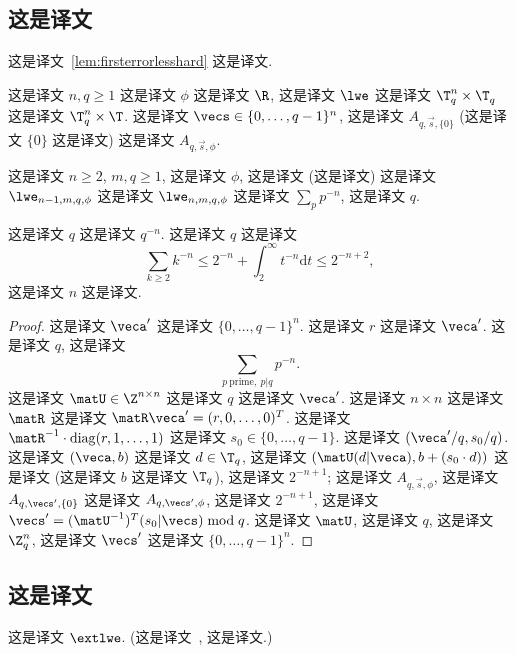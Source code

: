
\subsection{这是译文}
\label{sec:firstiserrorless}

这是译文~\ref{lem:firsterrorlesshard} 这是译文. 

\begin{definition}\label{def:firsterrorless} 这是译文 $n,q \ge 1$ 这是译文 $\phi$ 这是译文 $\R$, 这是译文 $\lwe$ 这是译文 $\T_q^n \times \T_q^{}$ 这是译文 $\T_q^n \times \T$. 这是译文 $\vecs \in \{0,\ldots,q-1\}^n$, 这是译文 $A_{q,\vec{s},\{0\}}$ (这是译文 $\{0\}$ 这是译文) 这是译文 $A_{q,\vec{s},\phi}$.
\end{definition}


\begin{lemma}\label{lem:firsterrorlesshard} 这是译文 $n \ge 2$, $m, q \ge 1$, 这是译文 $\phi$, 这是译文 (这是译文) 这是译文 $\lwe_{n-1,m,q,\phi}$ 这是译文 $\lwe_{n,m,q,\phi}$ 这是译文 $\sum_p p^{-n}$, 这是译文 $q$.
\end{lemma}
这是译文 $q$ 这是译文 $q^{-n}$. 这是译文 $q$ 这是译文 \[
\sum_{k \ge 2} k^{-n} \le 2^{-n} + \int_{2}^\infty t^{-n} \mathrm{d} t \le 2^{-n+2},
\] 这是译文 $n$ 这是译文.
\begin{proof}
这是译文 $\veca'$ 这是译文  $\{0,\ldots,q-1\}^n$. 这是译文 $r$ 这是译文 $\veca'$.  这是译文 $q$, 这是译文  \[
 \sum_{p~\text{prime}, \ p|q} p^{-n}.
\] 这是译文 $\matU \in \Z^{n \times n}$ 这是译文 $q$ 这是译文 $\veca'$. 这是译文 $n\times n$ 这是译文 $\matR$ 这是译文 $\matR \veca' = (r,0,\ldots,0)^T$. 这是译文 $\matR^{-1} \cdot \mathrm{diag}(r,1,\ldots,1)$ 这是译文 $s_0 \in \{0,\ldots,q-1\}$. 这是译文 $(\veca'/q, s_0/q)$. 这是译文 $(\veca,b)$ 这是译文 $d \in \T_q$, 这是译文 $(\matU(d|\veca),b+(s_0 \cdot d))$ 这是译文 (这是译文 $b$ 这是译文 $\T_q$), 这是译文 $2^{-n+1}$; 这是译文 $A_{q,\vec{s},\phi}$, 这是译文 $A_{q,\vecs',\{0\}}$ 这是译文 $A_{q,\vecs',\phi}$, 这是译文 $2^{-n+1}$, 这是译文 $\vecs' = (\matU^{-1})^T (s_0|\vecs) \bmod q$. 这是译文 $\matU$, 这是译文 $q$, 这是译文 $\Z_q^n$, 这是译文 $\vecs'$ 这是译文 $\{0,\ldots,q-1\}^n$.
\end{proof}

\subsection{这是译文}
\label{sec:extlwe}

这是译文 $\extlwe$. (这是译文~\cite{DBLP:conf/pkc/Alperin-SheriffP12}, 这是译文.)

